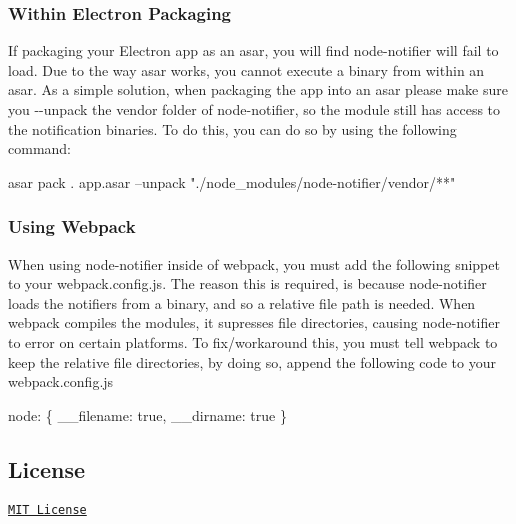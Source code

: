 \subsubsection*{Within Electron Packaging}

If packaging your Electron app as an {\ttfamily asar}, you will find node-\/notifier will fail to load. Due to the way asar works, you cannot execute a binary from within an asar. As a simple solution, when packaging the app into an asar please make sure you {\ttfamily -\/-\/unpack} the vendor folder of node-\/notifier, so the module still has access to the notification binaries. To do this, you can do so by using the following command\+:


\begin{DoxyCode}
asar pack . app.asar --unpack "./node\_modules/node-notifier/vendor/**"
\end{DoxyCode}


\subsubsection*{Using Webpack}

When using node-\/notifier inside of webpack, you must add the following snippet to your {\ttfamily webpack.\+config.\+js}. The reason this is required, is because node-\/notifier loads the notifiers from a binary, and so a relative file path is needed. When webpack compiles the modules, it supresses file directories, causing node-\/notifier to error on certain platforms. To fix/workaround this, you must tell webpack to keep the relative file directories, by doing so, append the following code to your {\ttfamily webpack.\+config.\+js}


\begin{DoxyCode}
node: \{
  \_\_filename: true,
  \_\_dirname: true
\}
\end{DoxyCode}


\subsection*{License}

\href{http://en.wikipedia.org/wiki/MIT_License}{\tt M\+IT License} 